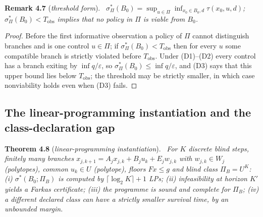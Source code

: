 \documentclass[11pt,a4paper]{article}
\theoremstyle{plain}
\theoremstyle{definition}
\theoremstyle{remark}
\newenvironment{restated}[2]{\par\medskip\noindent\textbf{#1} (\textit{#2}).\ \itshape}{\par\medskip}
\newcommand{\Tobs}{T_{\mathrm{obs}}}
\newcommand{\hyp}[1]{\textup{(#1)}}
\begin{document}
\begin{restated}{Remark 4.7}{threshold form}
$\sigma^*_\Pi(B_0)=\sup_{u\in\Pi}\inf_{x_0\in B_0,d}\tau(x_0,u,d)$; $\sigma^*_\Pi(B_0)<\Tobs$ implies that no policy in $\Pi$ is viable from $B_0$.
\end{restated}

\begin{proof}
Before the first informative observation a policy of $\Pi$ cannot distinguish branches and is one control $u\in\Pi$; if $\sigma^*_\Pi(B_0)<\Tobs$ then for every $u$ some compatible branch is strictly violated before $\Tobs$. Under \hyp{D1}--\hyp{D2} every control has a branch exiting by $\inf q/\varepsilon$, so $\sigma^*_\Pi(B_0)\le\inf q/\varepsilon$, and \hyp{D3} says that this upper bound lies below $\Tobs$; the threshold may be strictly smaller, in which case nonviability holds even when \hyp{D3} fails.
\end{proof}

\subsection{The linear-programming instantiation and the class-declaration gap}\label{S:lp}

\begin{restated}{Theorem 4.8}{linear-programming instantiation}
For $K$ discrete blind steps, finitely many branches $x_{j,k+1}=A_jx_{j,k}+B_ju_k+E_jw_{j,k}$ with $w_{j,k}\in W_j$ (polytopes), common $u_k\in U$ (polytope), floors $Fx\le g$ and blind class $\Pi_B=U^K$: (i) $\sigma^*(B_0;\Pi_B)$ is computed by $\lceil\log_2K\rceil+1$ LPs; (ii) infeasibility at horizon $K'$ yields a Farkas certificate; (iii) the programme is sound and complete for $\Pi_B$; (iv) a different declared class can have a strictly smaller survival time, by an unbounded margin.
\end{restated}
\end{document}
